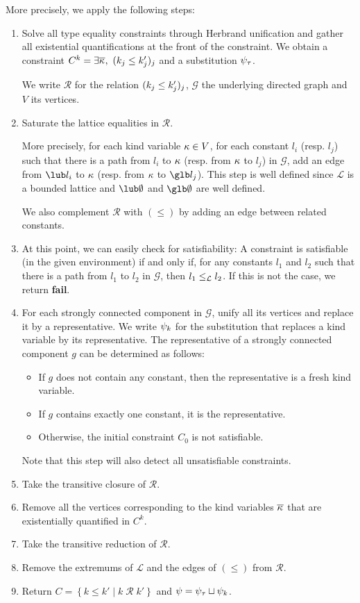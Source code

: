 More precisely, we apply the following steps:
\begin{enumerate}
\item Solve all type equality constraints through Herbrand unification and
  gather all existential quantifications at the front of the constraint.
  We obtain a constraint $C^k = \exists \overline{\kappa_{{}}},\ (k_j \leq k'_j)_j$ and
  a substitution $\mathrm{\psi}_\tau$.

  We write $\mathcal R$ for the relation $(k_j \leq k'_j)_j$,
  $\mathcal G$ the underlying directed graph and $V$ its vertices.

\item Saturate the lattice equalities in $\mathcal R$.

  More precisely, for each kind variable $\kappa \in V$,
  for each constant $l_i$ (resp. $l_j$) such that
  there is a path from $l_i$ to $\kappa$ (resp. from $\kappa$ to $l_j$) in $\mathcal G$,
  add an edge from $\lub l_i$ to $\kappa$
  (resp. from $\kappa$ to $\glb l_j$).
  This step is well defined since $\mathcal L$ is a bounded lattice
  and $\lub\emptyset$ and $\glb\emptyset$ are well defined.

  We also complement $\mathcal R$ with $(\leq)$ by adding an edge
  between related constants.
\item
  At this point, we can easily check for satisfiability: A constraint
  is satisfiable (in the given environment) if and only if,
  for any constants $l_1$ and $l_2$ such that
  there is a path from $l_1$ to $l_2$ in $\mathcal G$, then $l_1\leq_\mathcal L l_2$.
  If this is not the case, we return \textbf{fail}.

\item For each strongly connected component in $\mathcal G$, unify all its vertices and replace it by a representative.
  We write $\mathrm{\psi}_k$ for the substitution that replaces a kind variable by
  its representative.
  The representative of a strongly connected component $g$ can be determined as follows:
  \begin{itemize}
  \item If $g$ does not contain any constant, then the representative
    is a fresh kind variable.
  \item If $g$ contains exactly one constant, it is the representative.
  \item Otherwise, the initial constraint $C_0$ is not satisfiable.
  \end{itemize}
  Note that this step will also detect all unsatisfiable constraints.
\item Take the transitive closure of $\mathcal R$.
\item Remove all the vertices corresponding to the kind variables $\overline{\kappa_{{}}}$
  that are existentially quantified in $C^k$.
\item Take the transitive reduction of $\mathcal R$.
\item Remove the extremums of $\mathcal L$ and the edges of $(\leq)$
  from $\mathcal R$.
\item Return $C = \left\{ k \leq k' \mid k \operatorname{\mathcal R}k' \right\}$
  and $\mathrm{\psi} =  \mathrm{\psi}_\tau \sqcup \mathrm{\psi}_k$.
\end{enumerate}

